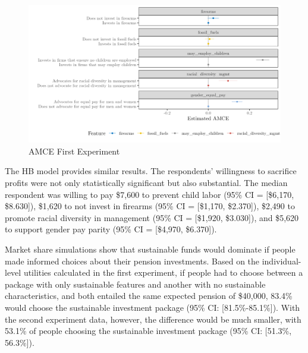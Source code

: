 \documentclass[
  12pt,
]{article}
\begin{document}
\begin{figure}

{\centering \includegraphics{amcecj1jmainb} 

}

\caption{AMCE First Experiment}\label{fig:amce1cjmain}
\end{figure}

The HB model provides similar results. The respondents' willingness to sacrifice profits were not only statistically significant but also substantial. The median respondent was willing to pay \$7,600 to prevent child labor (95\% CI = {[}\$6,170, \$8.630{]}), \$1,620 to not invest in firearms (95\% CI = {[}\$1,170, \$2.370{]}), \$2,490 to promote racial diversity in management (95\% CI = {[}\$1,920, \$3.030{]}), and \$5,620 to support gender pay parity (95\% CI = {[}\$4,970, \$6.370{]}).

Market share simulations show that sustainable funds would dominate if people made informed choices about their pension investments. Based on the individual-level utilities calculated in the first experiment, if people had to choose between a package with only sustainable features and another with no sustainable characteristics, and both entailed the same expected pension of \$40,000, 83.4\% would choose the sustainable investment package (95\% CI: {[}81.5\%-85.1\%{]}). With the second experiment data, however, the difference would be much smaller, with 53.1\% of people choosing the sustainable investment package (95\% CI: {[}51.3\%, 56.3\%{]}).
\end{document}

